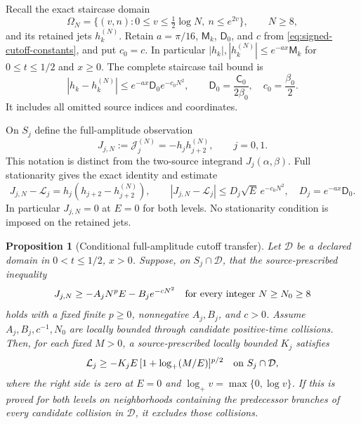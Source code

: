 \documentclass[11pt]{article}
\numberwithin{equation}{section}
\newtheorem{proposition}[theorem]{Proposition}
\theoremstyle{definition}
\theoremstyle{remark}
\newcommand{\Lag}{\mathcal L}
\begin{document}
Recall the exact staircase domain
\[
 \Omega_N=\{(v,n):0\le v\le\tfrac12\log N,\ n\le e^{2v}\},
 \qquad N\ge8,
\]
and its retained jets $h_k^{(N)}$.  Retain $a=\pi/16$, $\mathsf M_k$, $\mathsf D_0$, and $c$ from
\eqref{eq:signed-cutoff-constants}, and put $c_0=c$.
In particular $|h_k|,|h_k^{(N)}|\le e^{-ax}\mathsf M_k$ for
$0\le t\le1/2$ and $x\ge0$.  The complete staircase tail bound is
\begin{equation}
 |h_k-h_k^{(N)}|\le e^{-ax}\mathsf D_0e^{-c_0N^2},\qquad
 \mathsf D_0=\frac{\mathsf C_0}{2\beta_0},\quad c_0=\frac{\beta_0}{2}.
 \label{pg:jet-tail}
\end{equation}
It includes all omitted source indices and coordinates.

On $S_j$ define the full-amplitude observation
\begin{equation}
 J_{j,N}:=\mathcal J_j^{(N)}=-h_jh_{j+2}^{(N)},\qquad j=0,1.
 \label{pg:full-amplitude}
\end{equation}
This notation is distinct from the two-source integrand $J_j(\alpha,\beta)$.
Full stationarity gives the exact identity and estimate
\begin{equation}
 J_{j,N}-\Lag_j=h_j(h_{j+2}-h_{j+2}^{(N)}),\qquad
 |J_{j,N}-\Lag_j|\le D_j\sqrt E\,e^{-c_0N^2},
 \quad D_j=e^{-ax}\mathsf D_0.
 \label{pg:J-tail}
\end{equation}
In particular $J_{j,N}=0$ at $E=0$ for both levels.  No stationarity
condition is imposed on the retained jets.

\begin{proposition}[Conditional full-amplitude cutoff transfer]
\label{pg:J-transfer}
Let $\mathcal D$ be a declared domain in $0<t\le1/2$, $x>0$.
Suppose, on $S_j\cap\mathcal D$, that the source-prescribed inequality
\begin{equation}
 J_{j,N}\ge-A_jN^pE-B_je^{-cN^2}
 \quad\hbox{for every integer }N\ge N_0\ge8
 \label{pg:J-target}
\end{equation}
holds with a fixed finite $p\ge0$, nonnegative $A_j,B_j$, and $c>0$.
Assume $A_j,B_j,c^{-1},N_0$ are locally bounded through candidate
positive-time collisions.  Then, for each fixed $M>0$, a
source-prescribed locally bounded $K_j$ satisfies
\begin{equation}
 \Lag_j\ge-K_jE\,[1+\log_+(M/E)]^{p/2}
 \quad\hbox{on }S_j\cap\mathcal D,
 \label{pg:J-log-loss}
\end{equation}
where the right side is zero at $E=0$ and
$\log_+v=\max\{0,\log v\}$.  If this is proved for both levels
on neighborhoods containing the predecessor branches of every
candidate collision in $\mathcal D$, it excludes those collisions.
\end{proposition}
\end{document}
